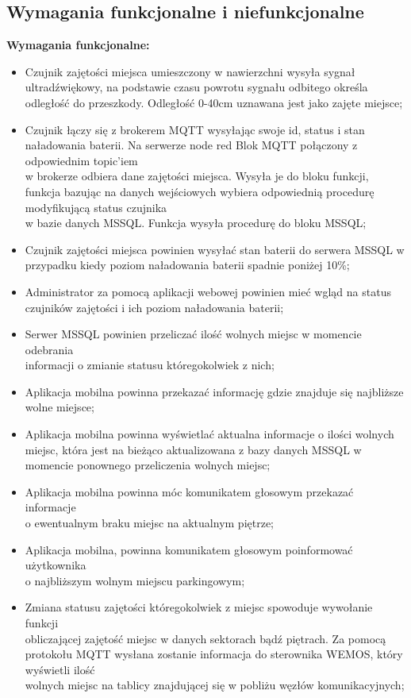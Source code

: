 \documentclass[12pt,a4paper]{article}
\begin{document}
\subsection{Wymagania funkcjonalne i niefunkcjonalne}
{\large \bf Wymagania funkcjonalne:}
\begin{itemize}
\item Czujnik zajętości miejsca umieszczony w nawierzchni wysyła sygnał ultradźwiękowy, na podstawie czasu powrotu sygnału odbitego określa odległość do przeszkody. Odległość 0-40cm uznawana jest jako zajęte miejsce;
\item Czujnik łączy się z brokerem MQTT wysyłając swoje id, status i stan naładowania baterii. Na serwerze node red Blok MQTT połączony z odpowiednim topic’iem\\w  brokerze odbiera dane zajętości miejsca. Wysyła je do bloku funkcji, funkcja bazując na danych wejściowych wybiera odpowiednią procedurę modyfikującą status czujnika\\w bazie danych MSSQL. Funkcja wysyła procedurę do bloku MSSQL;
\item Czujnik zajętości miejsca powinien wysyłać stan baterii do serwera MSSQL w przypadku kiedy poziom naładowania baterii spadnie poniżej 10\%;
\item Administrator za pomocą aplikacji webowej powinien mieć wgląd na status czujników zajętości i ich poziom naładowania baterii;
\item Serwer MSSQL powinien przeliczać ilość wolnych miejsc w momencie odebrania\\informacji o zmianie statusu któregokolwiek z nich;
\item Aplikacja mobilna powinna przekazać informację gdzie znajduje się najbliższe wolne miejsce;
\item Aplikacja mobilna powinna wyświetlać aktualna informacje o ilości wolnych miejsc, która jest na bieżąco aktualizowana z bazy danych MSSQL w momencie ponownego przeliczenia wolnych miejsc;
\item Aplikacja mobilna powinna móc komunikatem głosowym przekazać informacje\\o ewentualnym braku miejsc na aktualnym piętrze;
\item Aplikacja mobilna, powinna komunikatem głosowym poinformować użytkownika\\o najbliższym wolnym miejscu parkingowym;
\item Zmiana statusu zajętości któregokolwiek z miejsc spowoduje wywołanie funkcji\\obliczającej zajętość miejsc w danych sektorach bądź piętrach. Za pomocą protokołu MQTT wysłana zostanie informacja do sterownika WEMOS, który wyświetli ilość\\wolnych miejsc na tablicy znajdującej się w pobliżu węzłów komunikacyjnych;

\end{itemize}
\end{document}
